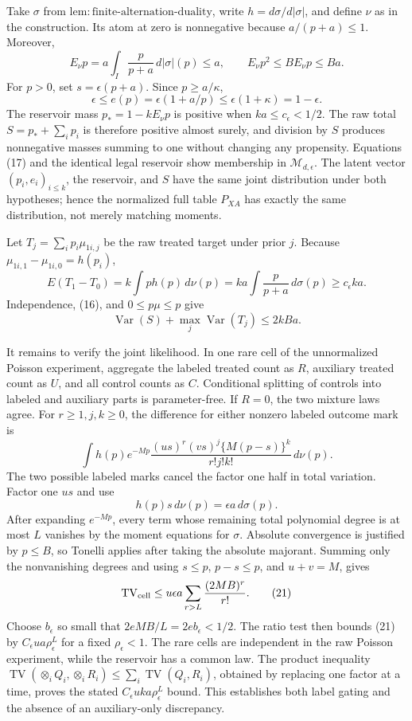 Take \(\sigma\) from \(\mathrm{lem:finite\mbox{-}alternation\mbox{-}duality}\), write \(h=d\sigma/d|\sigma|\), and define \(\nu\) as in the construction.  Its atom at zero is nonnegative because \(a/(p+a)\le1\).  Moreover,
\[
 E_\nu p=a\int_I\frac p{p+a}\,d|\sigma|(p)\le a,
 \qquad E_\nu p^2\le B E_\nu p\le Ba. \tag{16}
\]
For \(p>0\), set \(s=\epsilon(p+a)\).  Since \(p\ge a/\kappa\),
\[
 \epsilon\le e(p)=\epsilon(1+a/p)\le\epsilon(1+\kappa)=1-\epsilon. \tag{17}
\]
The reservoir mass \(p_*=1-kE_\nu p\) is positive when \(ka\le c_\epsilon<1/2\).  The raw total \(S=p_*+\sum_ip_i\) is therefore positive almost surely, and division by \(S\) produces nonnegative masses summing to one without changing any propensity.  Equations (17) and the identical legal reservoir show membership in \(\mathcal M_{d,\epsilon}\).  The latent vector \((p_i,e_i)_{i\le k}\), the reservoir, and \(S\) have the same joint distribution under both hypotheses; hence the normalized full table \(P_{XA}\) has exactly the same distribution, not merely matching moments.

Let \(T_j=\sum_ip_i\mu_{1i,j}\) be the raw treated target under prior \(j\).  Because \(\mu_{1i,1}-\mu_{1i,0}=h(p_i)\),
\[
 E(T_1-T_0)=k\int p h(p)\,d\nu(p)
 =ka\int\frac p{p+a}\,d\sigma(p)\ge c_\epsilon ka. \tag{18}
\]
Independence, (16), and \(0\le p\mu\le p\) give
\[
 \operatorname{Var}(S)+\max_j\operatorname{Var}(T_j)\le2kBa. \tag{19}
\]

It remains to verify the joint likelihood.  In one rare cell of the unnormalized Poisson experiment, aggregate the labeled treated count as \(R\), auxiliary treated count as \(U\), and all control counts as \(C\).  Conditional splitting of controls into labeled and auxiliary parts is parameter-free.  If \(R=0\), the two mixture laws agree.  For \(r\ge1,j,k\ge0\), the difference for either nonzero labeled outcome mark is
\[
 \int h(p)e^{-Mp}\frac{(us)^r(vs)^j\{M(p-s)\}^k}{r!j!k!}\,d\nu(p).
\]
The two possible labeled marks cancel the factor one half in total variation.  Factor one \(us\) and use
\[
 h(p)s\,d\nu(p)=\epsilon a\,d\sigma(p). \tag{20}
\]
After expanding \(e^{-Mp}\), every term whose remaining total polynomial degree is at most \(L\) vanishes by the moment equations for \(\sigma\).  Absolute convergence is justified by \(p\le B\), so Tonelli applies after taking the absolute majorant.  Summing only the nonvanishing degrees and using \(s\le p\), \(p-s\le p\), and \(u+v=M\), gives
\[
 \operatorname{TV}_{\rm cell}
 \le u\epsilon a\sum_{r>L}\frac{(2MB)^r}{r!}. \tag{21}
\]
Choose \(b_\epsilon\) so small that \(2eMB/L=2eb_\epsilon<1/2\).  The ratio test then bounds (21) by \(C_\epsilon ua\rho_\epsilon^L\) for a fixed \(\rho_\epsilon<1\).  The rare cells are independent in the raw Poisson experiment, while the reservoir has a common law.  The product inequality \(\operatorname{TV}(\otimes_iQ_i,\otimes_iR_i)\le\sum_i\operatorname{TV}(Q_i,R_i)\), obtained by replacing one factor at a time, proves the stated \(C_\epsilon uka\rho_\epsilon^L\) bound.  This establishes both label gating and the absence of an auxiliary-only discrepancy.

